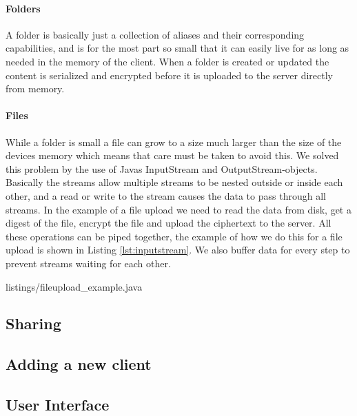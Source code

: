 \documentclass[pdftex,english,10pt,b5paper,twoside]{book}
\begin{document}
\paragraph{Folders}
A folder is basically just a collection of aliases and their corresponding
capabilities, and is for the most part so small that it can easily live for as
long as needed in the memory of the client. When a folder is created or updated
the content is serialized and encrypted before it is uploaded to the server
directly from memory.

\paragraph{Files}
While a folder is small a file can grow to a size much larger than the size of
the devices memory which means that care must be taken to avoid this. We solved
this problem by the use of Javas InputStream and OutputStream-objects.
Basically the streams allow multiple streams to be nested outside or inside
each other, and a read or write to the stream causes the data to pass through
all streams. In the example of a file upload we need to read the data from
disk, get a digest of the file, encrypt the file and upload the ciphertext to
the server. All these operations can be piped together, the example of how we
do this for a file upload is shown in Listing \ref{lst:inputstream}. We also buffer data for every
step to prevent streams waiting for each other.


{listings/fileupload_example.java}



\subsection{Sharing}

\subsection{Adding a new client}

\subsection{User Interface}
\end{document}
